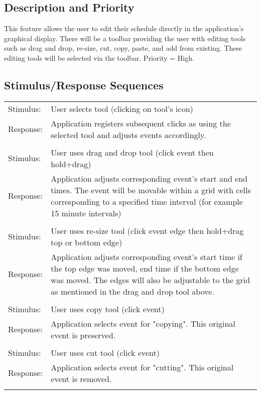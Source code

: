 \documentclass{scrreprt}
\begin{document}
\subsection{Description and Priority}
This feature allows the user to edit their schedule directly in the application's
graphical display. There will be a toolbar providing the user with editing tools
such as drag and drop, re-size, cut, copy, paste, and add from existing. These editing
tools will be selected via the toolbar. Priority = High.

\subsection{Stimulus/Response Sequences}
\begin{center}
    \begin{tabular}{ p{2cm} p{13cm} }
    Stimulus: & User selects tool (clicking on tool's icon)\\
    Response: & Application registers subsequent clicks as using the selected tool and
    adjusts events accordingly.\\
    \\
    Stimulus: & User uses drag and drop tool (click event then hold+drag)\\
    Response: & Application adjusts corresponding event's start and end times. The event
    will be movable within a grid with cells corresponding to a specified time
    interval (for example 15 minute intervals)\\
    \\
    Stimulus: & User uses re-size tool (click event edge then hold+drag top or bottom edge)\\
    Response: & Application adjusts corresponding event's start time if the top
    edge was moved, end time if the bottom edge was moved. The edges will also be adjustable
    to the grid as mentioned in the drag and drop tool above.\\
    \\
    Stimulus: & User uses copy tool (click event)\\
    Response: & Application selects event for "copying". This original event is preserved.\\
    \\
    Stimulus: & User uses cut tool (click event)\\
    Response: & Application selects event for "cutting". This original event is removed.\\
    \\

\end{tabular}
\end{center}
\end{document}
